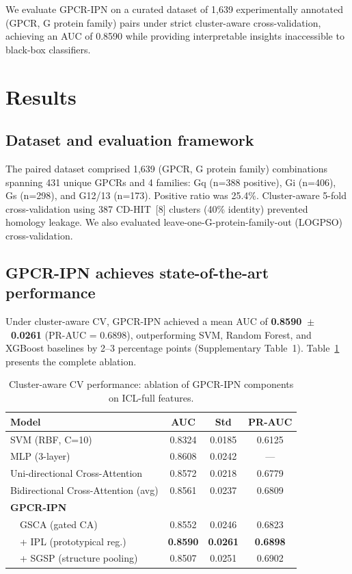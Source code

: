 \documentclass[unnumsec,webpdf,contemporary,large,numbered]{oup-authoring-template}
\begin{document}
We evaluate GPCR-IPN on a curated dataset of 1,639 experimentally annotated (GPCR, G protein family) pairs under strict cluster-aware cross-validation, achieving an AUC of 0.8590 while providing interpretable insights inaccessible to black-box classifiers.

\section{Results}

\subsection{Dataset and evaluation framework}

The paired dataset comprised 1,639 (GPCR, G protein family) combinations spanning 431 unique GPCRs and 4 families: Gq (n=388 positive), Gi (n=406), Gs (n=298), and G12/13 (n=173). Positive ratio was 25.4\%. Cluster-aware 5-fold cross-validation using 387 CD-HIT~[8] clusters (40\% identity) prevented homology leakage. We also evaluated leave-one-G-protein-family-out (LOGPSO) cross-validation.

\subsection{GPCR-IPN achieves state-of-the-art performance}

Under cluster-aware CV, GPCR-IPN achieved a mean AUC of \textbf{0.8590~$\pm$~0.0261} (PR-AUC = 0.6898), outperforming SVM, Random Forest, and XGBoost baselines by 2--3 percentage points (Supplementary Table~1). Table~\ref{tab:ablation} presents the complete ablation.

\begin{table}[htbp]
\centering
\caption{Cluster-aware CV performance: ablation of GPCR-IPN components on ICL-full features.}
\label{tab:ablation}
\begin{tabular*}{\textwidth}{@{\extracolsep{\fill}}lccc@{}}
\toprule
\textbf{Model} & \textbf{AUC} & \textbf{Std} & \textbf{PR-AUC} \\
\midrule
SVM (RBF, C=10) & 0.8324 & 0.0185 & 0.6125 \\
MLP (3-layer) & 0.8608 & 0.0242 & --- \\
Uni-directional Cross-Attention & 0.8572 & 0.0218 & 0.6779 \\
Bidirectional Cross-Attention (avg) & 0.8561 & 0.0237 & 0.6809 \\
\addlinespace
\textbf{GPCR-IPN} & & & \\
~~GSCA (gated CA) & 0.8552 & 0.0246 & 0.6823 \\
~~+ IPL (prototypical reg.) & \textbf{0.8590} & \textbf{0.0261} & \textbf{0.6898} \\
~~+ SGSP (structure pooling) & 0.8507 & 0.0251 & 0.6902 \\
\bottomrule
\end{tabular*}
\end{table}
\end{document}

